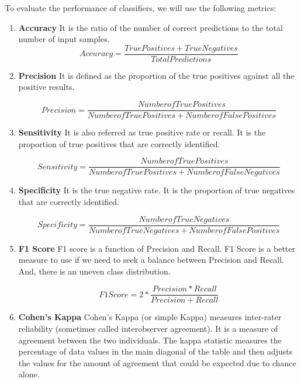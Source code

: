 \documentclass[]{article}
\begin{document}
To evaluate the performance of classifiers, we will use the following
metrics:

\begin{enumerate}
\item \textbf{Accuracy}
It is the ratio of the number of correct predictions to the total number of input samples.
\begin{equation}
Accuracy = \frac{True Positives + True Negatives} {Total Predictions}
\end{equation}

\item \textbf{Precision}
It is defined as the proportion of the true positives against all the positive
results.

\begin{equation}
Precision = \frac{Number of True Positives} {Number of True Positives + Number of False Positives}
\end{equation}

\item \textbf{Sensitivity}
It is also referred as true positive rate or recall. It is the proportion of true positives that are correctly identified.

\begin{equation}
Sensitivity = \frac{Number of True Positives} {Number of True Positives + Number of False Negatives}
\end{equation}


\item \textbf{Specificity}
It is the true negative rate. It is the proportion of true negatives that are
correctly identified.

\begin{equation}
Specificity = \frac{Number of True Negatives} {Number of True Negatives + Number of False Positives}
\end{equation}

\item \textbf{F1 Score}
F1 score is a function of Precision and Recall. F1 Score is a better measure to use if we need to seek a balance between Precision and Recall. And, there is an uneven class distribution.


\begin{equation}
F1 Score = 2 * \frac{Precision * Recall} {Precision + Recall}
\end{equation}

\item \textbf{Cohen's Kappa}
Cohen's Kappa (or simple Kappa) measures inter-rater reliability (sometimes called interobserver agreement). It is a measure of agreement between the two individuals. The kappa statistic measures the percentage of data values in the main diagonal of the table and then adjusts the values for the amount of agreement that could be expected due to chance alone.

\end{enumerate}
\end{document}
